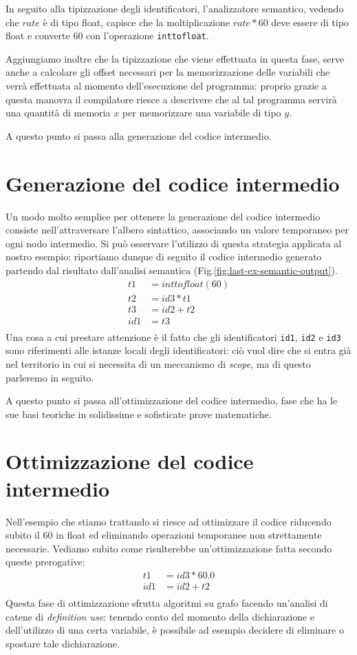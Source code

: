 \documentclass[class=book, crop=false, oneside, 12pt]{standalone}
\begin{document}
In seguito alla tipizzazione degli identificatori, l'analizzatore semantico, vedendo che \(rate\) è di tipo float, capisce che la moltiplicazione \(rate * 60\) deve essere di tipo float e converte \(60\) con l'operazione \texttt{inttofloat}.

Aggiungiamo inoltre che la tipizzazione che viene effettuata in questa fase, serve anche a calcolare gli offset necessari per la memorizzazione delle variabili che verrà effettuata al momento dell'esecuzione del programma: proprio grazie a questa manovra il compilatore riesce a descrivere che al tal programma servirà una quantità di memoria \(x\) per memorizzare una variabile di tipo \(y\).

A questo punto si passa alla generazione del codice intermedio.

\section{Generazione del codice intermedio}
Un modo molto semplice per ottenere la generazione del codice intermedio consiste nell'attraversare l'albero sintattico, associando un valore temporaneo per ogni nodo intermedio.
Si può osservare l'utilizzo di questa strategia applicata al nostro esempio: riportiamo dunque di seguito il codice intermedio generato partendo dal risultato dall'analisi semantica (Fig.\ref{fig:last-ex-semantic-output}).
\begin{align*}
    t1 &= inttofloat(60) \\
    t2 &= id3 * t1 \\
    t3 &= id2 + t2 \\
    id1 &= t3 \\
\end{align*}
Una cosa a cui prestare attenzione è il fatto che gli identificatori \texttt{id1}, \texttt{id2} e \texttt{id3} sono riferimenti alle istanze locali degli identificatori: ciò vuol dire che si entra già nel territorio in cui si necessita di un meccanismo di \emph{scope}, ma di questo parleremo in seguito.

A questo punto si passa all'ottimizzazione del codice intermedio, fase che ha le sue basi teoriche in solidissime e sofisticate prove matematiche.

\section{Ottimizzazione del codice intermedio}
Nell'esempio che stiamo trattando si riesce ad ottimizzare il codice riducendo subito il \(60\) in float ed eliminando operazioni temporanee non strettamente necessarie. Vediamo subito come risulterebbe un'ottimizzazione fatta secondo queste prerogative:
\begin{align*}
    t1 &= id3 * 60.0 \\
    id1 &= id2 + t2 \\
\end{align*}
Questa fase di ottimizzazione sfrutta algoritmi su grafo facendo un'analisi di catene di \emph{definition use}: tenendo conto del momento della dichiarazione e dell'utilizzo di una certa variabile, è possibile ad esempio decidere di eliminare o spostare tale dichiarazione.
\end{document}
